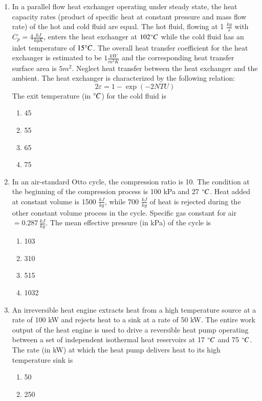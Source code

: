 \documentclass[journal]{IEEEtran}
\begin{document}
\begin{enumerate}
\begin{enumerate}
  \end{enumerate}
  \item In a parallel flow heat exchanger operating under steady state, the heat capacity rates (product of specific heat at constant pressure and mass flow rate) of the hot and cold fluid are equal. The hot fluid, flowing at 1 $\frac{kg}{s}$ with $C_p = 4  \frac{kJ}{kgK}$, enters the heat exchanger at $102\degree C$ while the cold fluid has an inlet temperature of $15\degree C$. The overall heat transfer coefficient for the heat exchanger is estimated to be $1 \frac{kW}{m^2K}$ and the corresponding heat transfer surface area is $5 m^2$. Neglect heat transfer between the heat exchanger and the ambient. The heat exchanger is characterized by the following relation:
 $$ 2\varepsilon = 1 - \exp(-2 NTU) $$
 The exit temperature (in $\degree C$) for the cold fluid is
  \begin{enumerate}
    \item  45
    \item  55
    \item  65
    \item  75
  \end{enumerate}
\item In an air-standard Otto cycle, the compression ratio is 10. The condition at the beginning of the compression process is 100 kPa and 27 $\degree C$. Heat added at constant volume is 1500 $\frac{kJ}{kg}$, while 700 $\frac{kJ}{kg}$ of heat is rejected during the other constant volume process in the cycle. Specific gas constant for air $= 0.287 \, \frac{kJ}{kg}$. The mean effective pressure (in kPa) of the cycle is
\begin{enumerate}
    \item  103
    \item  310
    \item  515
    \item  1032
  \end{enumerate}
  \item An irreversible heat engine extracts heat from a high temperature source at a rate of 100 kW and rejects heat to a sink at a rate of 50 kW. The entire work output of the heat engine is used to drive a reversible heat pump operating between a set of independent isothermal heat reservoirs at 17 $\degree C$ and 75 $\degree C$. The rate (in kW) at which the heat pump delivers heat to its high temperature sink is
  \begin{enumerate}
    \item  50
    \item  250

\end{enumerate}
\end{enumerate}
\end{document}
